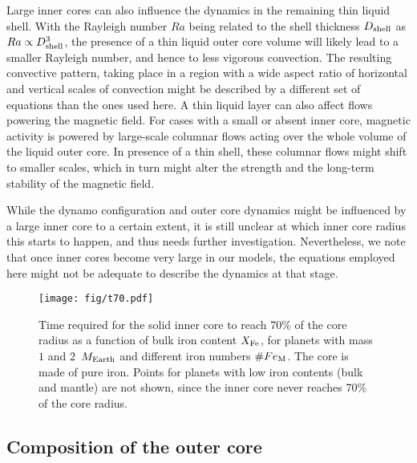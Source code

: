 \documentclass[draft]{agujournal2019} %
\begin{document}
Large inner cores can also influence the dynamics in the remaining thin liquid shell. With the Rayleigh number $Ra$ being related to the shell thickness $D_{\rm shell}$ as $Ra\propto D_{\rm shell}^{3}$, the presence of a thin liquid outer core volume will likely lead to a smaller Rayleigh number, and hence to less vigorous convection. The resulting convective pattern, taking place in a region with a wide aspect ratio of horizontal and vertical scales of convection might be described by a different set of equations than the ones used here. A thin liquid layer can also affect flows powering the magnetic field. For cases with a small or absent inner core, magnetic activity is powered by large-scale columnar flows acting over the whole volume of the liquid outer core. In presence of a thin shell, these columnar flows might shift to smaller scales, which in turn might alter the strength and the long-term stability of the magnetic field. 

While the dynamo configuration and outer core dynamics might be influenced by a large inner core to a certain extent, it is still unclear at which inner core radius this starts to happen, and thus needs further investigation. Nevertheless, we note that once inner cores become very large in our models, the equations employed here might not be adequate to describe the dynamics at that stage.

\begin{figure}
\texttt{[image: fig/t70.pdf]}
\caption{Time required for the solid inner core to reach 70\% of the core radius as a function of bulk iron content $X_{\rm Fe}$, for planets with mass $1$ and $2$~$M_{\rm Earth}$ and different iron numbers $\#Fe_{\rm M}$. The core is made of pure iron. Points for planets with low iron contents (bulk and mantle) are not shown, since the inner core never reaches 70\% of the core radius.}
\label{fig:t70}
\end{figure}

\subsection{Composition of the outer core}\label{sec:core_compo}
\end{document}
